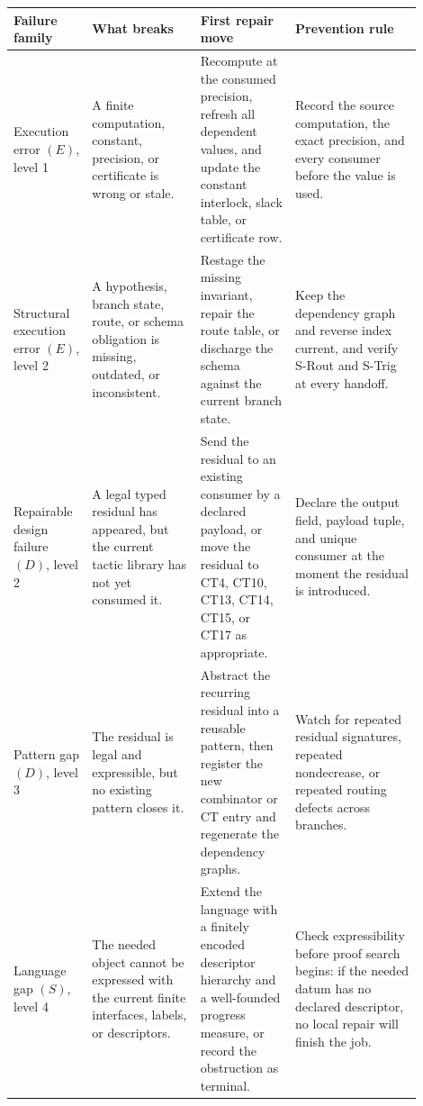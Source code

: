 \documentclass[
  11pt,
]{article}
\theoremstyle{definition}
\begin{document}
\begin{longtable}[]{@{}
  >{\raggedright\arraybackslash}p{0.16\linewidth}
  >{\raggedright\arraybackslash}p{0.24\linewidth}
  >{\raggedright\arraybackslash}p{0.21\linewidth}
  >{\raggedright\arraybackslash}p{0.29\linewidth}@{}}
\toprule\noalign{}
Failure family & What breaks & First repair move & Prevention rule \\
\midrule\noalign{}
\endhead
\bottomrule\noalign{}
\endlastfoot
Execution error \((E)\), level 1 & A finite computation, constant, precision, or certificate is wrong or stale. & Recompute at the consumed precision, refresh all dependent values, and update the constant interlock, slack table, or certificate row. & Record the source computation, the exact precision, and every consumer before the value is used. \\
Structural execution error \((E)\), level 2 & A hypothesis, branch state, route, or schema obligation is missing, outdated, or inconsistent. & Restage the missing invariant, repair the route table, or discharge the schema against the current branch state. & Keep the dependency graph and reverse index current, and verify S-Rout and S-Trig at every handoff. \\
Repairable design failure \((D)\), level 2 & A legal typed residual has appeared, but the current tactic library has not yet consumed it. & Send the residual to an existing consumer by a declared payload, or move the residual to CT4, CT10, CT13, CT14, CT15, or CT17 as appropriate. & Declare the output field, payload tuple, and unique consumer at the moment the residual is introduced. \\
Pattern gap \((D)\), level 3 & The residual is legal and expressible, but no existing pattern closes it. & Abstract the recurring residual into a reusable pattern, then register the new combinator or CT entry and regenerate the dependency graphs. & Watch for repeated residual signatures, repeated nondecrease, or repeated routing defects across branches. \\
Language gap \((S)\), level 4 & The needed object cannot be expressed with the current finite interfaces, labels, or descriptors. & Extend the language with a finitely encoded descriptor hierarchy and a well-founded progress measure, or record the obstruction as terminal. & Check expressibility before proof search begins: if the needed datum has no declared descriptor, no local repair will finish the job. \\
\end{longtable}
\end{document}
